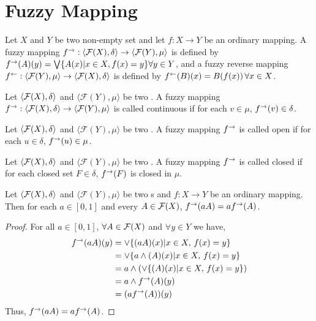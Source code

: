 \documentclass[../main-sheet.tex]{subfiles}
\begin{document}
\chapter{Fuzzy Mapping}
\begin{defn}
    Let \(X \) and \(Y \) be two non-empty set and let \(f:X\to Y \) be an ordinary mapping. A fuzzy mapping \(f^{\rightarrow}:\langle \mathcal{F}(X), \delta \rangle\to\langle \mathcal{F}(Y),\mu\rangle \) is defined by \(f^{\rightarrow}(A)(y)=\bigvee \{A(x)|x\in X, f(x)=y \} \forall y\in Y\), and a fuzzy reverse mapping \(f^{\leftarrow}:\langle \mathcal{F}(Y),\mu\rangle \to \langle \mathcal{F}(X), \delta \rangle\) is defined by \(f^{\leftarrow}(B)(x)=B(f(x))\,\forall x\in X\).
\end{defn}
\begin{defn}
    Let \(\langle \mathcal{F}(X), \delta \rangle\) and \(\langle \mathcal{F}(Y),\mu\rangle\) be two \fts. A fuzzy mapping \(f^{\rightarrow}:\langle \mathcal{F}(X), \delta \rangle\to\langle \mathcal{F}(Y),\mu\rangle\) is called continuous if for each \(v\in \mu\), \(f^{\rightarrow}(v)\in \delta\).
\end{defn}
\begin{defn}
    Let \(\langle \mathcal{F}(X), \delta \rangle\) and \(\langle \mathcal{F}(Y),\mu\rangle\) be two \fts. A fuzzy mapping \(f^{\rightarrow}\) is called open if for each \(u\in \delta\), \(f^{\rightarrow}(u)\in \mu\).
\end{defn}
\begin{defn}
    Let \(\langle \mathcal{F}(X), \delta \rangle\) and \(\langle \mathcal{F}(Y),\mu\rangle\) be two \fts. A fuzzy mapping \(f^{\rightarrow}\) is called closed if for each closed set \(F\in \delta\), \(f^{\rightarrow}(F)\) is closed in \(\mu\).
\end{defn}
\begin{thm}
    Let \(\langle \mathcal{F}(X), \delta \rangle\) and \(\langle \mathcal{F}(Y),\mu\rangle\) be two \fts s and \(f:X\to Y \) be an ordinary mapping. Then for each \(a\in[0,1]\) and every \(A\in \mathcal{F}(X) \), \(f^{\rightarrow}(aA)=af^{\rightarrow}(A )\).
\end{thm}
\begin{proof}
    For all \(a\in[0,1]\), \(\forall A\in \mathcal{F}(X) \) and \(\forall y \in Y\) we have,
    \begin{align*}
        f^{\rightarrow}(aA)(y)&=\vee\{(aA)(x)|x\in X,\,f(x)=y \}\\
        &=\vee\{a\wedge (A)(x)|x\in X,\,f(x)=y \}\\
        &=a\wedge\left( \vee\{(A)(x)|x\in X,\,f(x)=y \}\right)\\
        &=a\wedge f^{\rightarrow}(A)(y)\\
        &=(af^{\rightarrow}(A))(y)
    \end{align*}
    Thus, \(f^{\rightarrow}(aA )=af^{\rightarrow}(A)\).
\end{proof}
\end{document}
